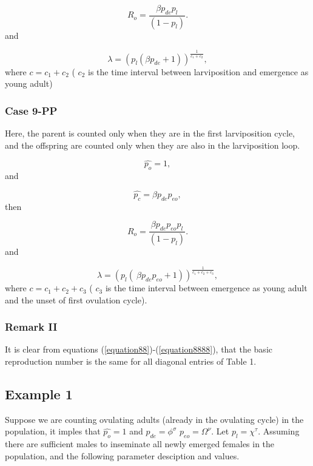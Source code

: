 \documentclass[10pt,a4paper]{article}
\begin{document}
 \begin{equation}
 \label{equation886} 
 R_o =\frac{\beta p_{de}p_l}{(1-p_l)}.
 \end{equation} and
 
 \begin{equation}
 \label{equation106} 
 \lambda =(p_l(\beta p_{de} + 1))^\frac{1}{c_1 + c_2},
 \end{equation}
 where $c = c_1 + c_2$ ( $c_2$ is the time interval between larviposition and emergence as young adult)

\subsubsection*{Case 9-PP}

Here, the parent is counted only when they are in the first larviposition cycle, and the offspring are counted only when they are also in the larviposition loop.

$$\hat{p_o}= 1,$$ and 

$$\hat{p_c}= \beta p_{de}p_{eo},$$ then 

\begin{equation}
\label{equation8888} 
R_o =\frac{\beta p_{de}p_{eo}p_l}{(1-p_l)}. 
\end{equation} and

\begin{equation}
\label{equation105} 
\lambda =(p_l(\ \beta p_{de}p_{eo}+1))^\frac{1}{c_1 + c_2 + c_3},
\end{equation} 
where $c = c_1 + c_2 + c_3$ ( $c_3$ is the time interval between emergence as young adult and the unset of first ovulation cycle). 








\subsubsection*{Remark II}

It is clear from equations (\ref{equation88})-(\ref{equation8888}), that the basic reproduction number is the same for all diagonal entries of Table 1. 




\subsection*{Example 1}

Suppose we are counting ovulating adults (already in the ovulating cycle) in the population, it imples that  $\hat{p_o} = 1$ and $p_{de} = \phi^\sigma$ $p_{eo} =\Omega^\nu$. Let $p_{l} = \chi^\tau$. Assuming there are sufficient males to inseminate all newly emerged females in the population, and the following parameter desciption and values. 
\end{document}
